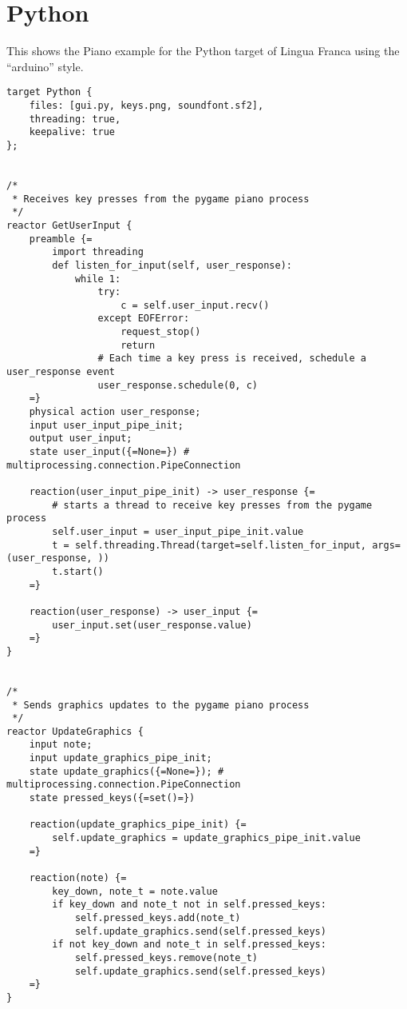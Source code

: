 \documentclass{article}
\begin{document}
\newpage
\section{Python}

This shows the Piano example for the Python target of Lingua Franca using the
``arduino'' style.

\begin{verbatim}
target Python {
    files: [gui.py, keys.png, soundfont.sf2],
    threading: true,
    keepalive: true
};


/*
 * Receives key presses from the pygame piano process
 */
reactor GetUserInput {
    preamble {=
        import threading
        def listen_for_input(self, user_response):
            while 1:
                try:
                    c = self.user_input.recv()
                except EOFError:
                    request_stop()
                    return
                # Each time a key press is received, schedule a user_response event 
                user_response.schedule(0, c)
    =}
    physical action user_response;
    input user_input_pipe_init;
    output user_input;
    state user_input({=None=}) # multiprocessing.connection.PipeConnection
    
    reaction(user_input_pipe_init) -> user_response {=
        # starts a thread to receive key presses from the pygame process
        self.user_input = user_input_pipe_init.value
        t = self.threading.Thread(target=self.listen_for_input, args=(user_response, ))
        t.start()
    =}
    
    reaction(user_response) -> user_input {=
        user_input.set(user_response.value)
    =}
}


/*
 * Sends graphics updates to the pygame piano process
 */
reactor UpdateGraphics {
    input note;
    input update_graphics_pipe_init;
    state update_graphics({=None=}); # multiprocessing.connection.PipeConnection
    state pressed_keys({=set()=})
    
    reaction(update_graphics_pipe_init) {=
        self.update_graphics = update_graphics_pipe_init.value
    =}
    
    reaction(note) {=
        key_down, note_t = note.value
        if key_down and note_t not in self.pressed_keys:
            self.pressed_keys.add(note_t)
            self.update_graphics.send(self.pressed_keys)
        if not key_down and note_t in self.pressed_keys:
            self.pressed_keys.remove(note_t)
            self.update_graphics.send(self.pressed_keys)
    =}
}



\end{verbatim}
\end{document}
